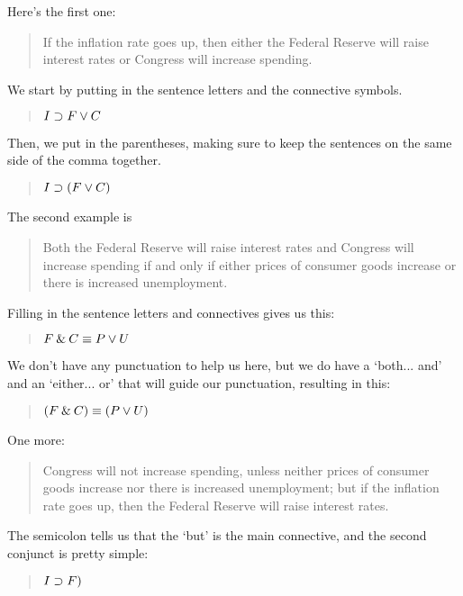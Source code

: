 \documentclass[../logic-text.tex]{subfiles}
\begin{document}
Here's the first one:

\begin{quote}
  If the inflation rate goes up, then either the Federal Reserve will raise interest rates or Congress will increase spending.
\end{quote}

We start by putting in the sentence letters and the connective symbols.

\begin{quote}
  \(I \supset F \lor C\)
\end{quote}

Then, we put in the parentheses, making sure to keep the sentences on the same side of the comma together.

\begin{quote}
  \(I \supset (F \lor C)\)
\end{quote}

The second example is

\begin{quote}
  Both the Federal Reserve will raise interest rates and Congress will increase spending if and only if either prices of consumer goods increase or there is increased unemployment.
\end{quote}


Filling in the sentence letters and connectives gives us this:

\begin{quote}
  \(F \mathbin{\&} C \equiv P \lor U\)
\end{quote}

We don't have any punctuation to help us here, but we do have a \enquote*{both... and} and an \enquote*{either... or} that will guide our punctuation, resulting in this:

\begin{quote}
  \((F \mathbin{\&} C) \equiv (P \lor U)\)
\end{quote}


One more:

\begin{quote}
  Congress will not increase spending, unless neither prices of consumer goods increase nor there is increased unemployment; but if the inflation rate goes up, then the Federal Reserve will raise interest rates.
\end{quote}

The semicolon tells us that the \enquote*{but} is the main connective, and the second conjunct is pretty simple:

\begin{quote}
  \(I \supset F) \)
\end{quote}
\end{document}
